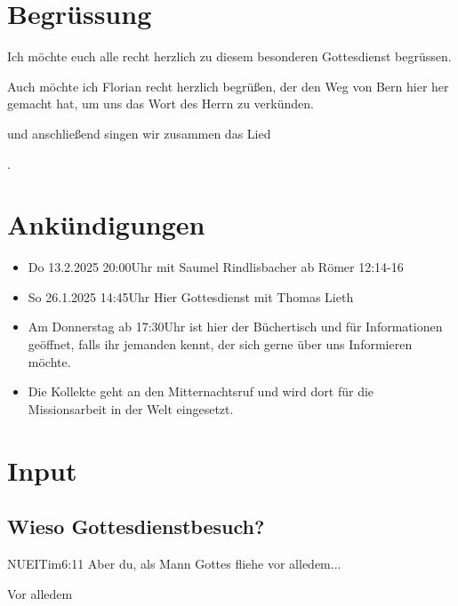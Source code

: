 
\section{Begrüssung}

Ich möchte euch alle recht herzlich zu diesem besonderen Gottesdienst begrüssen.

Auch möchte ich Florian recht herzlich begrüßen, der den Weg von Bern hier her gemacht hat, um uns das Wort des Herrn zu verkünden. 

\noindent
\beten{} und anschließend singen wir zusammen das Lied

\noindent
{}.

\section{Ankündigungen}
\begin{itemize}
    \item {} Do 13.2.2025 20:00Uhr mit Saumel Rindlisbacher  ab Römer 12:14-16
    \item {} So 26.1.2025 14:45Uhr Hier Gottesdienst mit Thomas Lieth
    \item {} Am Donnerstag ab 17:30Uhr ist hier der Büchertisch und für Informationen geöffnet, falls ihr jemanden kennt, der sich gerne über uns Informieren möchte.
    \item {} Die Kollekte geht an den Mitternachtsruf und wird dort für die Missionsarbeit in der Welt eingesetzt.
\end{itemize}

\section{ Input }
\begin{spacing}{1.5}
\subsection{ Wieso Gottesdienstbesuch? }


\begin{bibelbox}{NUE}{ITim}{6:11}
Aber du, als Mann Gottes fliehe vor alledem...
\end{bibelbox}

\glqq Vor alledem \grqq{} 

\end{spacing}


